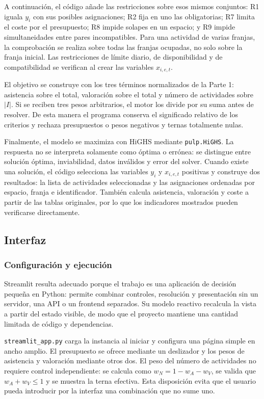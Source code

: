 A continuación, el código añade las restricciones sobre esos mismos conjuntos:
R1 iguala \(y_i\) con sus posibles asignaciones; R2 fija en uno las
obligatorias; R7 limita el coste por el presupuesto; R8 impide solapes en un
espacio; y R9 impide simultaneidades entre pares incompatibles. Para una
actividad de varias franjas, la comprobación se realiza sobre todas las franjas
ocupadas, no solo sobre la franja inicial. Las restricciones de límite diario,
de disponibilidad y de compatibilidad se verifican al crear las variables
$x_{i,e,t}$.

El objetivo se construye con los tres términos normalizados de la Parte 1:
asistencia sobre el total, valoración sobre el total y número de actividades
sobre $|I|$. Si se reciben tres pesos arbitrarios, el motor los divide por su
suma antes de resolver. De esta manera el programa conserva el significado
relativo de los criterios y rechaza presupuestos o pesos negativos y ternas
totalmente nulas.

Finalmente, el modelo se maximiza con HiGHS mediante \texttt{pulp.HiGHS}.
La respuesta no se interpreta solamente como óptima o errónea: se distingue
entre solución óptima, inviabilidad, datos inválidos y error del solver. Cuando
existe una solución, el código selecciona las variables \(y_i\) y
\(x_{i,e,t}\) positivas y construye dos resultados: la lista de actividades
seleccionadas y las asignaciones ordenadas por espacio, franja e identificador.
También calcula asistencia, valoración y coste a partir de las tablas originales,
por lo que los indicadores mostrados pueden verificarse directamente.

\subsection{Interfaz}

\subsubsection{Configuración y ejecución}

Streamlit resulta adecuado porque el trabajo es una aplicación de decisión
pequeña en Python: permite combinar controles, resolución y presentación sin
un servidor, una API o un frontend separados. Su modelo reactivo recalcula
la vista a partir del estado visible, de modo que el proyecto mantiene una
cantidad limitada de código y dependencias.

\texttt{streamlit\_app.py} carga la instancia al iniciar y configura una página
simple en ancho amplio. El presupuesto se ofrece mediante un deslizador y los
pesos de asistencia y valoración mediante otros dos. El peso del número de
actividades no requiere control independiente: se calcula como
$w_N=1-w_A-w_V$, se valida que $w_A+w_V\leq1$ y se muestra la terna efectiva.
Esta disposición evita que el usuario pueda introducir por la interfaz una
combinación que no sume uno.

